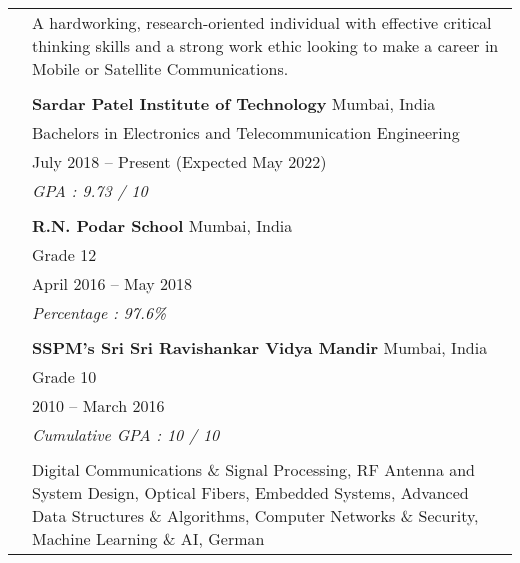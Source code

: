 \documentclass[letterpaper, 10pt]{article}
\begin{document}
\begin{longtable}{p{1.3in}p{4.8in}}


\nohyphens{\color{OliveGreen}{About}}
& A hardworking, research-oriented individual with effective critical thinking skills and a strong work ethic looking to make a career in Mobile or Satellite Communications.\\
& \\



\color{OliveGreen}{Education} 
& \textbf{Sardar Patel Institute of Technology} \hfill Mumbai, India \\ 
& Bachelors in Electronics and Telecommunication Engineering \\
& July 2018 -- Present (Expected May 2022) \\
& {\it GPA : 9.73 / 10}\\
& \\

& \textbf{R.N. Podar School} \hfill Mumbai, India \\
& Grade 12\\
& April 2016 -- May 2018\\
& {\it Percentage : 97.6\%}\\
& \\

& \textbf{SSPM's Sri Sri Ravishankar Vidya Mandir} \hfill Mumbai, India\\
& Grade 10 \\
& 2010 -- March 2016 \\
& {\it Cumulative GPA : 10 / 10}\\
& \\

\color{OliveGreen}{Coursework}
& Digital Communications \& Signal Processing, RF Antenna and System Design, Optical Fibers, Embedded Systems, Advanced Data Structures \& Algorithms, Computer Networks \& Security, Machine Learning \& AI, German


\end{longtable}
\end{document}
